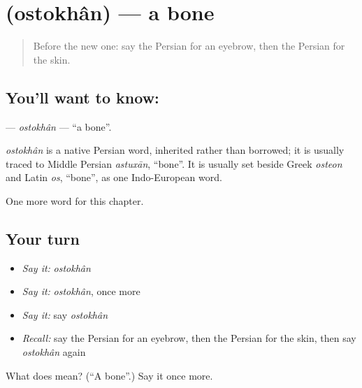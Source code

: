 \section[\texorpdfstring{\fa{استخوان} (ostokhân)}{استخوان (ostokhân)}]{ (ostokhân) — a bone}

\label{lesson:FA-C109-ostokhan}



\begin{quote}
Before the new one: say the Persian for an eyebrow, then the Persian for the skin.
\end{quote}

\subsection*{You'll want to know: }
\textbf{} — \emph{ostokhân} — \textquotedblleft{}a bone\textquotedblright{}.

\begin{cousinweb}
\emph{ostokhân} is a native Persian word, inherited rather than borrowed; it is usually traced to Middle Persian \emph{astuxān}, \textquotedblleft{}bone\textquotedblright{}. It is usually set beside Greek \emph{osteon} and Latin \emph{os}, \textquotedblleft{}bone\textquotedblright{}, as one Indo-European word.
\end{cousinweb}

\begin{grammarlens}[title={What you've built}]
One more word for this chapter.
\end{grammarlens}

\subsection*{Your turn}
\begin{itemize}
\raggedright
  \item \emph{Say it:} \emph{ostokhân}
  \item \emph{Say it:} \emph{ostokhân}, once more
  \item \emph{Say it:} say \emph{ostokhân}
  \item \emph{Recall:} say the Persian for an eyebrow, then the Persian for the skin, then say \emph{ostokhân} again
\end{itemize}

\begin{tcolorbox}[breakable,colback=teal!4,colframe=teal!35!black,title={Before you move on}]
What does  mean? (\textquotedblleft{}A bone\textquotedblright{}.) Say it once more.
\end{tcolorbox}
